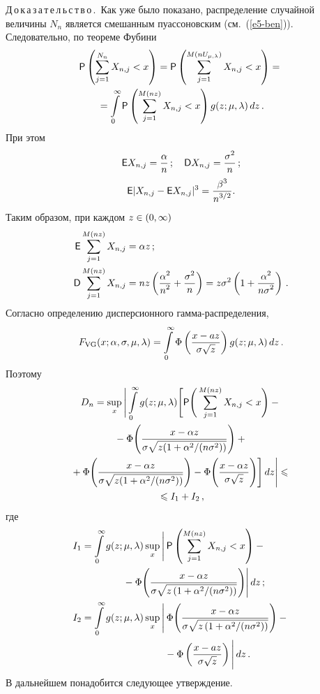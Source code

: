 \begin{multicols}{2}
\noindent
Д\,о\,к\,а\,з\,а\,т\,е\,л\,ь\,с\,т\,в\,о\,.\ Как уже было показано, распределение
случайной величины $N_n$ является смешанным пуассоновским (см.~(\ref{e5-ben})).
Следовательно, по теореме Фубини
\begin{multline*}
{\sf P}\left(\sum\limits_{j=1}^{N_n}X_{n,j}<x\right)=
{\sf P}\left(\sum\limits_{j=1}^{M(nU_{\mu,\lambda})}X_{n,j}<x\right)={}\\
{}=
\int\limits_0^{\infty}{\sf P}\left(\sum\limits_{j=1}^{M(nz)}X_{n,j}<x\right)g(z;\mu,\lambda)\,dz\,.
\end{multline*}
При этом
\begin{gather*}
{\sf E}X_{n,j}=\displaystyle\frac{\displaystyle \alpha\mathstrut}{\displaystyle n\mathstrut}\,;\quad
{\sf D}X_{n,j}=\displaystyle\frac{\displaystyle \sigma^2\mathstrut}{\displaystyle n\mathstrut}\,;\\ 
{\sf E}|X_{n,j}-{\sf E}X_{n,j}|^3=\displaystyle\frac{\displaystyle \beta^3\mathstrut}{\displaystyle n^{3/2}\mathstrut}.
\end{gather*}
Таким образом, при каждом $z\hm\in(0,\infty)$
\begin{align*}
{\sf E}\sum\limits_{j=1}^{M(nz)}X_{n,j}&=\alpha z\,;
\\
{\sf D}\sum\limits_{j=1}^{M(nz)}X_{n,j}&=nz\left(\displaystyle\frac{\displaystyle \alpha^2\mathstrut}{\displaystyle n^2\mathstrut}+\displaystyle\frac{\displaystyle \sigma^2\mathstrut}{\displaystyle n\mathstrut}\right)=
z\sigma^2\left(1+\displaystyle\frac{\displaystyle \alpha^2\mathstrut}{\displaystyle n\sigma^2\mathstrut}\right)\,.
\end{align*}
Согласно определению дисперсионного гам\-ма-рас\-пре\-де\-ления,
$$
F_{\mathrm{VG}}(x;\alpha,\sigma,\mu,\lambda)=\int\limits_{0}^{\infty}
\Phi\left(\displaystyle\frac{\displaystyle x-az\mathstrut}{\displaystyle \sigma\sqrt{z}\mathstrut}\right)g(z;\mu,\lambda)\,dz\,.
$$
Поэтому
\begin{multline}
D_n=\sup_x\Bigg|\int\limits_{0}^{\infty}g(z;\mu,\lambda)\Bigg[{\sf P}
\Bigg(\sum\limits_{j=1}^{M(nz)}X_{n,j}<x\Bigg)-{}\\
{}-\Phi\Bigg(\displaystyle\frac{\displaystyle x-\alpha z\mathstrut}{\displaystyle \sigma\sqrt{z(1+{\alpha^2}/({n\sigma^2}))}\mathstrut}\Bigg)+{}\\
{}+\Phi\Bigg(\displaystyle\frac{\displaystyle x-\alpha z\mathstrut}{\displaystyle \sigma\sqrt{z(1+{\alpha^2}/({n\sigma^2}))}\mathstrut}\Bigg)-
\Phi\Bigg(\displaystyle\frac{\displaystyle x-\alpha z\mathstrut}{\displaystyle \sigma\sqrt{z}\mathstrut}\Bigg)\Bigg]\,dz\Bigg| \leqslant{}\\
{}\leqslant I_1+I_2\,,
\label{e6-ben}
\end{multline}
где
\begin{align*}
I_1&=\int\limits_{0}^{\infty}g(z;\mu,\lambda)\sup_x\Bigg|\,{\sf P}
\left(\sum\limits_{j=1}^{M(nz)}X_{n,j}<x\right)-{}\\
&\hspace*{15mm}{}-\Phi\Bigg(\fr{x-\alpha z}
{\sigma\sqrt{z\left(1+{\alpha^2}/(n\sigma^2)\right)}}\Bigg)\Bigg|\,dz\,;
\\
I_2&=\int\limits_{0}^{\infty}g(z;\mu,\lambda)
\sup\limits_x\Bigg|\,\Phi\Bigg(\fr{x-\alpha
z}{\sigma\sqrt{z\left(1+{\alpha^2}/(n\sigma^2)\right)}}\Bigg)-{}\\
&\hspace*{30mm}{}-
\Phi\left(\fr{x-az}{\sigma\sqrt{z}}\right)\Bigg|\,dz\,.
\end{align*}
В дальнейшем понадобится следующее утверждение.


\end{multicols}

